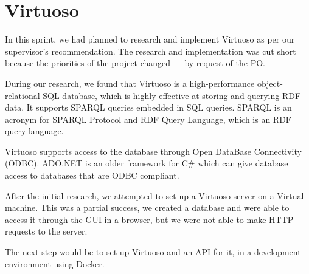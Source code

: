 \section{Virtuoso}
In this sprint, we had planned to research and implement Virtuoso as per our supervisor's recommendation.
The research and implementation was cut short because the priorities of the \knox{} project changed --- by request of the PO.

During our research, we found that Virtuoso is a high-performance object-relational SQL database, which is highly effective at storing and querying RDF data. It supports SPARQL queries embedded in SQL queries. SPARQL is an acronym for SPARQL Protocol and RDF Query Language, which is an RDF query language.


Virtuoso supports access to the database through Open DataBase Connectivity (ODBC).
ADO.NET is an older framework for C\# which can give database access to databases that are ODBC compliant.


After the initial research, we attempted to set up a Virtuoso server on a Virtual machine. This was a partial success, we created a database and were able to access it through the GUI in a browser, but we were not able to make HTTP requests to the server.

The next step would be to set up Virtuoso and an API for it, in a development environment using Docker.